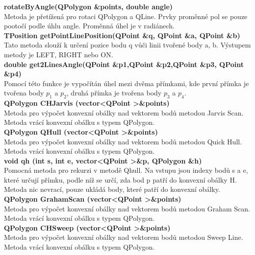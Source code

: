 \documentclass[a4paper, 12pt]{article}
\begin{document}
\textbf{rotateByAngle(QPolygon \&points, double angle)}\\
Metoda je přetížená pro rotaci QPolygon a QLine. Prvky proměnné pol se pouze pootočí podle úhlu angle. Proměnná úhel je v radiánech. 
\\

\textbf{TPosition getPointLinePosition(QPoint \&q, QPoint \&a, QPoint \&b)}\\
Tato metoda slouží k určení pozice bodu q vůči linii tvořené body a, b. Výstupem metody je LEFT, RIGHT nebo ON.\\


\textbf{double get2LinesAngle(QPoint \&p1,QPoint \&p2,QPoint \&p3, QPoint \&p4)}\\
Pomocí této funkce je vypočítán úhel mezi dvěma přímkami, kde první přímka je tvořena body $ p_1 $ a $p_2$, druhá přímka je tvořena body $ p_3 $ a $p_4$.\\


\textbf{QPolygon CHJarvis (vector\textless QPoint \textgreater \&points)}\\
Metoda pro výpočet konvexní obálky nad vektorem bodů metodou Jarvis Scan. Metoda vrácí konvexní obálku s typem QPolygon.
\\

\textbf{QPolygon QHull (vector\textless QPoint \textgreater \&points)}\\
Metoda pro výpočet konvexní obálky nad vektorem bodů metodou Quick Hull. Metoda vrácí konvexní obálku s typem QPolygon.
\\

\textbf{void qh (int s, int e, vector\textless QPoint \textgreater \&p, QPolygon \&h)}\\
Pomocná metoda pro rekurzi v metodě Qhull. Na vstupu jsou indexy bodů s a e, které určují přímku, podle níž se určí, zda bod p patří do konvexní obálky H. Metoda nic nevrací, pouze ukládá body, které patří do konvexní obálky.
\\

\textbf{QPolygon GrahamScan (vector\textless QPoint \textgreater \&points)}\\
Metoda pro výpočet konvexní obálky nad vektorem bodů metodou Graham Scan. Metoda vrácí konvexní obálku s typem QPolygon.
\\

\textbf{QPolygon CHSweep (vector\textless QPoint \textgreater \&points)}\\
Metoda pro výpočet konvexní obálky nad vektorem bodů metodou Sweep Line. Metoda vrácí konvexní obálku s typem QPolygon.
\\
\end{document}
